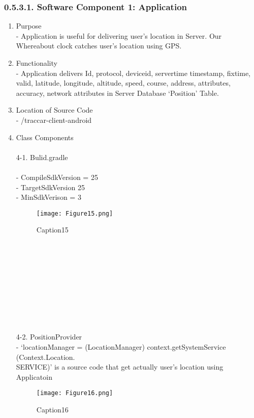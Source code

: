 \documentclass[10pt,a4paper,twocolumn]{report}
\begin{document}
		\subsubsection{0.5.3.1. Software Component 1: Application}
		\begin{enumerate}
		\item Purpose \\
		- Application is useful for delivering user’s location in Server. Our Whereabout clock catches user’s location using GPS. \\
		\item Functionality \\
		- Application delivers Id, protocol, deviceid, servertime timestamp, fixtime, valid, latitude, longitude, altitude, speed, course, address, attributes, accuracy, network attributes in Server Database ‘Position’ Table.\\
		\item Location of Source Code \\
		- /traccar-client-android \\
		\item Class Components \\\\
		4-1. Bulid.gradle \\ \\
		- CompileSdkVersion = 25 \\
		- TargetSdkVersion 25 \\
		- MinSdkVerison = 3 \\
			\begin{figure}[h]
				\texttt{[image: Figure15.png]}
				\caption{Caption15}
				\label{fig15}
			\end{figure}  \\\\\\\\\\\\\\\\\\
			
			
		4-2. PositionProvider \\
		- ‘locationManager = (LocationManager) context.getSystemService (Context.Location. \\SERVICE)’ is a source code that get actually user’s location using Applicatoin \\
		
		\begin{figure}[h]
				\texttt{[image: Figure16.png]}
				\caption{Caption16}
				\label{fig16}
		\end{figure}
		

\end{enumerate}
\end{document}
